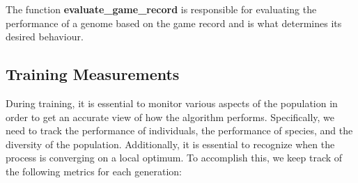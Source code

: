 \documentclass[letterpaper, 12pt]{article}
\begin{document}
The function \textbf{evaluate\_game\_record} is responsible for evaluating the
performance of a genome based on the game record and is what determines its desired
behaviour.

\subsection{Training Measurements}
During training, it is essential to monitor various aspects of the population in order
to get an accurate view of how the algorithm performs. Specifically, we need to track
the performance of individuals, the performance of species, and the diversity of the
population. Additionally, it is essential to recognize when the process is converging on
a local optimum. To accomplish this, we keep track of the following metrics for each
generation:
\end{document}
